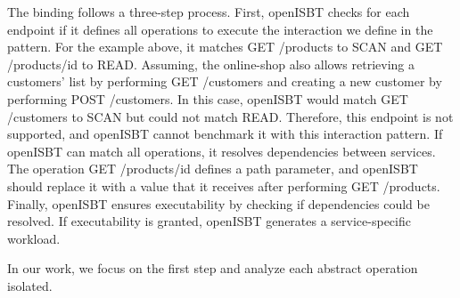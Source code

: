 The binding follows a three-step process. First, openISBT checks for each endpoint if it defines all operations to execute the interaction we define in the pattern. For the example above, it matches GET /products to SCAN and GET /products/{id} to READ. Assuming, the online-shop also allows retrieving a customers' list by performing GET /customers and creating a new customer by performing POST /customers. In this case, openISBT would match GET /customers to SCAN but could not match READ. Therefore, this endpoint is not supported, and openISBT cannot benchmark it with this interaction pattern. If openISBT can match all operations, it resolves dependencies between services. The operation GET /products/{id} defines a path parameter, and openISBT should replace it with a value that it receives after performing GET /products. Finally, openISBT ensures executability by checking if dependencies could be resolved. If executability is granted, openISBT generates a service-specific workload.

In our work, we focus on the first step and analyze each abstract operation isolated.